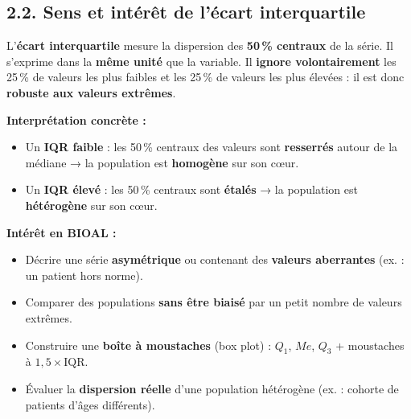 \documentclass[11pt,a4paper]{article}
\begin{document}
\subsection*{2.2. Sens et intérêt de l'écart interquartile}

\begin{interpretation}
L'\textbf{écart interquartile} mesure la dispersion des \textbf{50\,\% centraux} de la série. Il s'exprime dans la \textbf{même unité} que la variable. Il \textbf{ignore volontairement} les 25\,\% de valeurs les plus faibles et les 25\,\% de valeurs les plus élevées : il est donc \textbf{robuste aux valeurs extrêmes}.

\vspace{0.2cm}
\textbf{Interprétation concrète :}
\begin{itemize}[leftmargin=*]
  \item Un \textbf{IQR faible} : les 50\,\% centraux des valeurs sont \textbf{resserrés} autour de la médiane → la population est \textbf{homogène} sur son cœur.
  \item Un \textbf{IQR élevé} : les 50\,\% centraux sont \textbf{étalés} → la population est \textbf{hétérogène} sur son cœur.
\end{itemize}

\vspace{0.2cm}
\textbf{Intérêt en BIOAL :}
\begin{itemize}[leftmargin=*]
  \item Décrire une série \textbf{asymétrique} ou contenant des \textbf{valeurs aberrantes} (ex. : un patient hors norme).
  \item Comparer des populations \textbf{sans être biaisé} par un petit nombre de valeurs extrêmes.
  \item Construire une \textbf{boîte à moustaches} (box plot) : $Q_1$, $Me$, $Q_3$ + moustaches à $1{,}5 \times \text{IQR}$.
  \item Évaluer la \textbf{dispersion réelle} d'une population hétérogène (ex. : cohorte de patients d'âges différents).
\end{itemize}
\end{interpretation}
\end{document}
